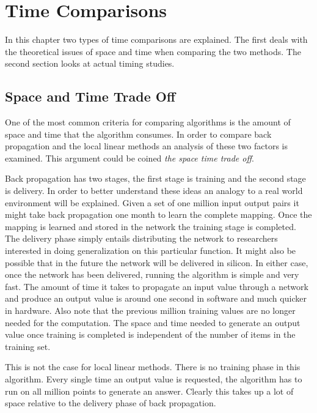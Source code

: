 \parskip 0.20in
\textheight 8.75in
\textwidth 6.0in
\topmargin -0.25in
\oddsidemargin 0.40in


\baselineskip 0.30in

\setcounter{chapter}{5}
\setcounter{page}{37}

\chapter{Time Comparisons}

	In this chapter two types of time comparisons are explained.
The first deals with the theoretical issues of space and time when
comparing the two methods.  The second section looks at actual timing
studies.

\section{Space and Time Trade Off}

	One of the most common criteria for comparing algorithms is
the amount of space and time that the algorithm consumes.  In order to
compare back propagation and the local linear methods an analysis of
these two factors is examined.  This argument could be coined {\it the
space time trade off}.

	Back propagation has two stages, the first stage is training
and the second stage is delivery.  In order to better understand these
ideas an analogy to a real world environment will be explained.  Given
a set of one million input output pairs it might take back propagation
one month to learn the complete mapping.  Once the mapping is learned
and stored in the network the training stage is completed.  The
delivery phase simply entails distributing the network to researchers
interested in doing generalization on this particular function.  It
might also be possible that in the future the network will be
delivered in silicon.  In either case, once the network has been
delivered, running the algorithm is simple and very fast.  The amount
of time it takes to propagate an input value through a network and
produce an output value is around one second in software and much
quicker in hardware.  Also note that the previous million training
values are no longer needed for the computation.  The space and time
needed to generate an output value once training is completed is
independent of the number of items in the training set.

	This is not the case for local linear methods.  There is no
training phase in this algorithm.  Every single time an output value
is requested, the algorithm has to run on all million points to
generate an answer.  Clearly this takes up a lot of space relative to
the delivery phase of back propagation.


